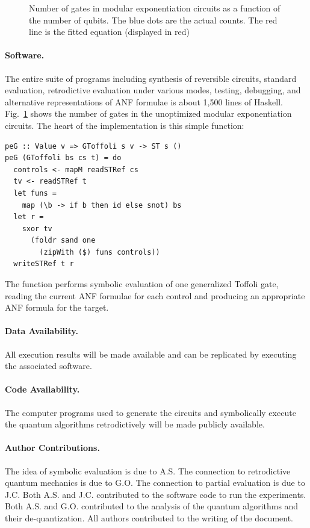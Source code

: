 \documentclass[aps,prl,twocolumn,superscriptaddress,floatfix,notitlepage]{revtex4-2}
\begin{document}
\begin{figure}[b]
    \centering
    \caption{Number of gates in modular exponentiation circuits as a function of the number of qubits. The blue dots are the actual counts. The red line is the fitted equation (displayed in red)}
    \label{fig:gates}
\end{figure}
\paragraph*{Software.}
The entire suite of programs including synthesis of reversible
circuits, standard evaluation, retrodictive evaluation under various
modes, testing, debugging, and alternative representations of ANF
formulae is about 1,500 lines of Haskell. Fig.~\ref{fig:gates} shows the number of gates in the unoptimized modular exponentiation circuits. The heart of the
implementation is this simple function:

\begin{verbatim}
peG :: Value v => GToffoli s v -> ST s ()
peG (GToffoli bs cs t) = do
  controls <- mapM readSTRef cs
  tv <- readSTRef t
  let funs = 
    map (\b -> if b then id else snot) bs
  let r = 
    sxor tv 
      (foldr sand one 
        (zipWith ($) funs controls))
  writeSTRef t r
\end{verbatim}
The function performs symbolic evaluation of one generalized Toffoli
gate, reading the current ANF formulae for each control and producing
an appropriate ANF formula for the target.

\paragraph*{Data Availability.}
All execution results will be made available and can be replicated by
executing the associated software.

\paragraph*{Code Availability.}
The computer programs used to generate the circuits and symbolically
execute the quantum algorithms retrodictively will be made publicly
available.

\paragraph*{Author Contributions.}
The idea of symbolic evaluation is due to A.S. The connection to
retrodictive quantum mechanics is due to G.O. The connection to
partial evaluation is due to J.C. Both A.S. and J.C. contributed to
the software code to run the experiments. Both A.S. and
G.O. contributed to the analysis of the quantum algorithms and their
de-quantization. All authors contributed to the writing of the
document.
\end{document}
